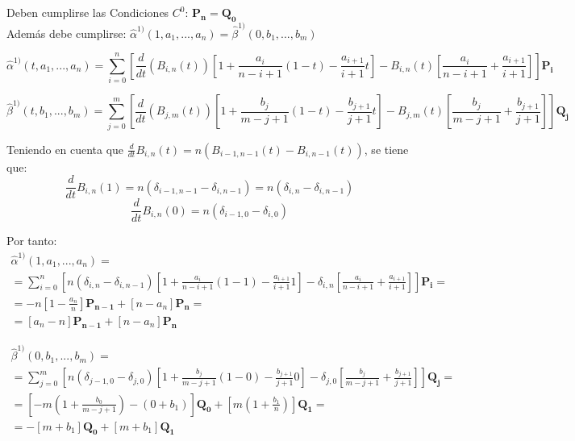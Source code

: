 \documentclass{article}
\begin{document}
Deben cumplirse las Condiciones $C^0$: $\mathbf{P_n} = \mathbf{Q_0} $\\

Además debe cumplirse: $\hat{\alpha}^{1)}(1,a_1,...,a_n) = \hat{\beta}^{1)}(0,b_1,...,b_m)$

\begin{equation*}
\hat{\alpha}^{1)}(t,a_1,...,a_n) = \sum_{i=0}^n \left[\frac{d}{dt}\left( B_{i,n}(t) \right) \left[ 1 + \frac{a_i}{n-i+1}(1-t) - \frac{a_{i+1}}{i+1}t \right] -B_{i,n}(t) \left[\frac{a_i}{n-i+1} + \frac{a_{i+1}}{i+1} \right] \right] \mathbf{P_i}
\end{equation*}

\begin{equation*}
\hat{\beta}^{1)}(t,b_1,...,b_m) = \sum_{j=0}^m \left[\frac{d}{dt}\left( B_{j,m}(t) \right) \left[ 1 + \frac{b_j}{m-j+1}(1-t) - \frac{b_{j+1}}{j+1}t \right] -B_{j,m}(t) \left[\frac{b_j}{m-j+1} + \frac{b_{j+1}}{j+1} \right] \right] \mathbf{Q_j}
\end{equation*}

Teniendo en cuenta que $\frac{d}{dt}B_{i,n}(t) = n\left( B_{i-1,n-1}(t) - B_{i,n-1}(t) \right)$, se tiene que:
\begin{equation*}
\frac{d}{dt}B_{i,n}(1) = n(\delta_{i-1,n-1} - \delta_{i,n-1}) = n(\delta_{i,n} - \delta_{i,n-1})
\end{equation*}
\begin{equation*}
\frac{d}{dt}B_{i,n}(0) = n(\delta_{i-1,0} - \delta_{i,0})
\end{equation*}

Por tanto:
\begin{gather*}
\hat{\alpha}^{1)}(1,a_1,...,a_n) = \\
= \sum_{i=0}^n \left[ n \left( \delta_{i,n} - \delta_{i,n-1} \right) \left[ 1 + \frac{a_i}{n-i+1}(1-1) - \frac{a_{i+1}}{i+1}1 \right] -\delta_{i,n} \left[\frac{a_i}{n-i+1} + \frac{a_{i+1}}{i+1} \right] \right] \mathbf{P_i} = \\
= -n \left[ 1 - \frac{a_n}{n} \right]\mathbf{P_{n-1}} + \left[ n - a_n \right]\mathbf{P_n} = \\
= \left[ a_n - n \right]\mathbf{P_{n-1}} + \left[ n - a_n \right] \mathbf{P_n}
\end{gather*}

\begin{gather*}
\hat{\beta}^{1)}(0,b_1,...,b_m) = \\
=  \sum_{j=0}^m \left[n\left( \delta_{j-1,0} - \delta_{j,0} \right) \left[ 1 + \frac{b_j}{m-j+1}(1-0) - \frac{b_{j+1}}{j+1}0 \right] -\delta_{j,0} \left[\frac{b_j}{m-j+1} + \frac{b_{j+1}}{j+1} \right] \right] \mathbf{Q_j} = \\
= \left[-m\left(1 + \frac{b_0}{m-j+1} \right) - (0+b_1) \right]\mathbf{Q_0} + \left[m \left( 1 + \frac{b_1}{n} \right) \right] \mathbf{Q_1} = \\
= -\left[ m+b_1 \right]\mathbf{Q_0} + \left[ m + b_1 \right]\mathbf{Q_1}
\end{gather*}
\end{document}
